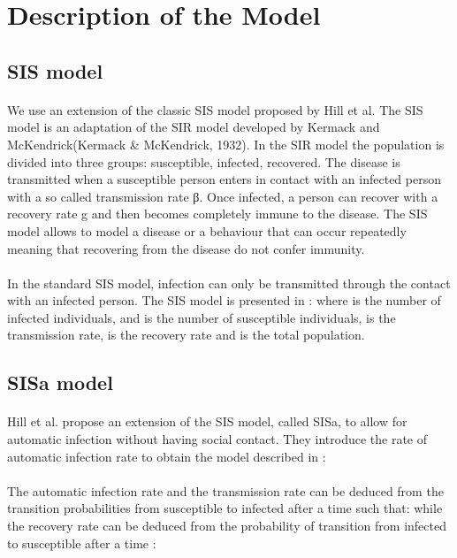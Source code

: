 \documentclass[11pt]{article}
\begin{document}
\section{Description of the Model}

\subsection{SIS model}
\paragraph{}
We use an extension of the classic SIS model proposed by Hill et al. The SIS model is an adaptation of the SIR model developed by Kermack and McKendrick(Kermack & McKendrick, 1932). In the SIR model the population is divided into three groups: susceptible, infected, recovered. The disease is transmitted when a susceptible person enters in contact with an infected person with a so called transmission rate β. Once infected, a person can recover with a recovery rate g and then becomes completely immune to the disease. The SIS model allows to model a disease or a behaviour that can occur repeatedly meaning that recovering from the disease do not confer immunity.

\paragraph{}

In the standard SIS model, infection can only be transmitted through the contact with an infected person. The SIS model is presented in :
where  is the number of  infected individuals, and  is the number of susceptible individuals,  is the transmission rate,  is the recovery rate and  is the total population. 

\subsection{SISa model}
\paragraph{}
Hill et al. propose an extension of the SIS model, called SISa, to allow for automatic infection without having social contact. They introduce the rate of automatic infection rate  to obtain the model described in :

\paragraph{}
The automatic infection rate  and the transmission rate can be deduced from the transition probabilities from susceptible to infected after a time  such that:
while the recovery rate can be deduced from the probability of transition from infected to susceptible after a time :
\end{document}

